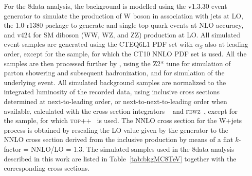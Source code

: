 For the 8\TeV data analysis, the background is modelled using the  v1.3.30 event generator to simulate the production of W boson in association with jets at LO,
the \POWHEG{} 1.0 r1380 package to generate \ttbar and single top quark events at NLO accuracy, and  v424 for SM diboson (WW, WZ, and ZZ) production at LO.
All simulated event samples are generated using the CTEQ6L1 PDF set with $\alpha_S$ also at leading order, except for the \POWHEG{} \ttbar sample,
for which the CT10 NNLO PDF set is used.
All the samples are then processed further by , using the Z2* tune for simulation of parton showering and subsequent hadronization,
and for simulation of the underlying event. All simulated background samples are normalized to the integrated luminosity of the recorded data, using inclusive cross sections determined at next-to-leading order,
or next-to-next-to-leading order when available, calculated with the cross section integrators \MCFM{}~\cite{Campbell:2003hd,Campbell:2011bn,Campbell:2012uf,Campbell:2004ch}
and \textsc{fewz}~\cite{Li:2012wna}, except for the \ttbar sample, for which \textsc{top++}~\cite{Czakon:2011xx} is used.
The NNLO cross section for the W+jets process is obtained by rescaling the LO value given by the generator to the NNLO cross section
derived from the inclusive production by means of a flat $k$-factor = NNLO/LO = 1.3.
The simulated samples used in the 8\TeV data analysis described in this work are listed in Table~\ref{tab:bkgMC8TeV} together with the corresponding cross sections.\\

